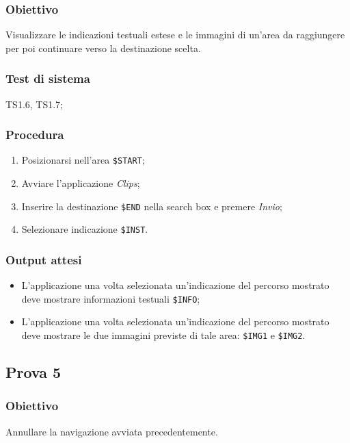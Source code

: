 \documentclass[../SperimentazioniPratiche.tex]{subfiles}
\begin{document}
	\subsubsection{Obiettivo}
		Visualizzare le indicazioni testuali estese e le immagini di un'area da raggiungere per poi continuare verso la destinazione scelta.
		
	\subsubsection{Test di sistema}
		TS1.6, TS1.7;
		
	\subsubsection{Procedura}
		\begin{enumerate}
		\item Posizionarsi nell'area  \verb|$START|;
		\item Avviare l'applicazione \textit{Clips};
		\item Inserire la destinazione  \verb|$END| nella search box e premere \textit{Invio};
		\item Selezionare indicazione  \verb|$INST|.
		\end{enumerate}

	\subsubsection{Output attesi}
		\begin{itemize}
		\item L'applicazione una volta selezionata un'indicazione del percorso mostrato deve mostrare informazioni testuali  \verb|$INFO|;
		\item L'applicazione una volta selezionata un'indicazione del percorso mostrato deve mostrare le due immagini previste di tale area:  \verb|$IMG1| e  \verb|$IMG2|.
		\end{itemize}
		
	
	
\newpage		
\subsection{Prova 5} %
\label{subsec:Prova5}
	
	\subsubsection{Obiettivo}
		Annullare la navigazione avviata precedentemente.
		
\end{document}
